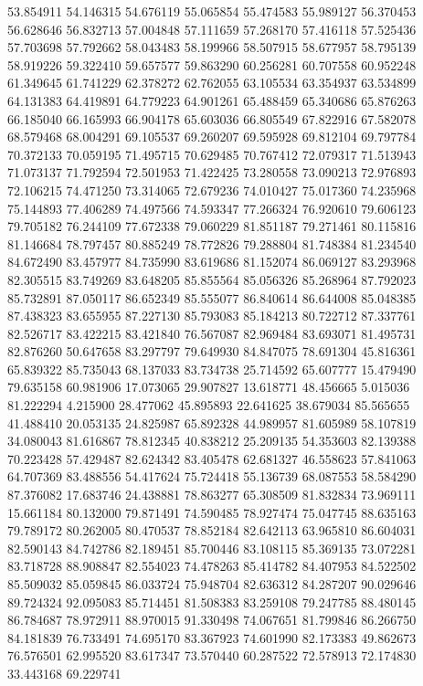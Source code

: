 53.854911
54.146315
54.676119
55.065854
55.474583
55.989127
56.370453
56.628646
56.832713
57.004848
57.111659
57.268170
57.416118
57.525436
57.703698
57.792662
58.043483
58.199966
58.507915
58.677957
58.795139
58.919226
59.322410
59.657577
59.863290
60.256281
60.707558
60.952248
61.349645
61.741229
62.378272
62.762055
63.105534
63.354937
63.534899
64.131383
64.419891
64.779223
64.901261
65.488459
65.340686
65.876263
66.185040
66.165993
66.904178
65.603036
66.805549
67.822916
67.582078
68.579468
68.004291
69.105537
69.260207
69.595928
69.812104
69.797784
70.372133
70.059195
71.495715
70.629485
70.767412
72.079317
71.513943
71.073137
71.792594
72.501953
71.422425
73.280558
73.090213
72.976893
72.106215
74.471250
73.314065
72.679236
74.010427
75.017360
74.235968
75.144893
77.406289
74.497566
74.593347
77.266324
76.920610
79.606123
79.705182
76.244109
77.672338
79.060229
81.851187
79.271461
80.115816
81.146684
78.797457
80.885249
78.772826
79.288804
81.748384
81.234540
84.672490
83.457977
84.735990
83.619686
81.152074
86.069127
83.293968
82.305515
83.749269
83.648205
85.855564
85.056326
85.268964
87.792023
85.732891
87.050117
86.652349
85.555077
86.840614
86.644008
85.048385
87.438323
83.655955
87.227130
85.793083
85.184213
80.722712
87.337761
82.526717
83.422215
83.421840
76.567087
82.969484
83.693071
81.495731
82.876260
50.647658
83.297797
79.649930
84.847075
78.691304
45.816361
65.839322
85.735043
68.137033
83.734738
25.714592
65.607777
15.479490
79.635158
60.981906
17.073065
29.907827
13.618771
48.456665
5.015036
81.222294
4.215900
28.477062
45.895893
22.641625
38.679034
85.565655
41.488410
20.053135
24.825987
65.892328
44.989957
81.605989
58.107819
34.080043
81.616867
78.812345
40.838212
25.209135
54.353603
82.139388
70.223428
57.429487
82.624342
83.405478
62.681327
46.558623
57.841063
64.707369
83.488556
54.417624
75.724418
55.136739
68.087553
58.584290
87.376082
17.683746
24.438881
78.863277
65.308509
81.832834
73.969111
15.661184
80.132000
79.871491
74.590485
78.927474
75.047745
88.635163
79.789172
80.262005
80.470537
78.852184
82.642113
63.965810
86.604031
82.590143
84.742786
82.189451
85.700446
83.108115
85.369135
73.072281
83.718728
88.908847
82.554023
74.478263
85.414782
84.407953
84.522502
85.509032
85.059845
86.033724
75.948704
82.636312
84.287207
90.029646
89.724324
92.095083
85.714451
81.508383
83.259108
79.247785
88.480145
86.784687
78.972911
88.970015
91.330498
74.067651
81.799846
86.266750
84.181839
76.733491
74.695170
83.367923
74.601990
82.173383
49.862673
76.576501
62.995520
83.617347
73.570440
60.287522
72.578913
72.174830
33.443168
69.229741
